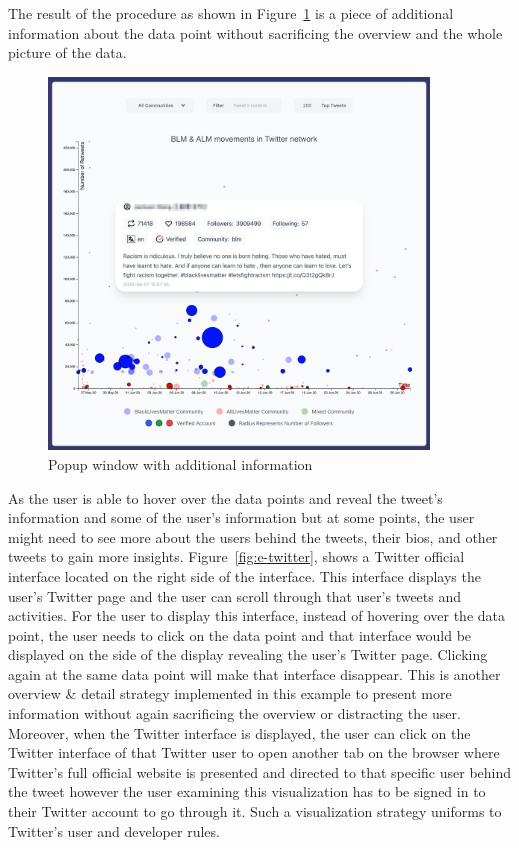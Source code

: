 \\\

The result of the procedure as shown in Figure~\ref{fig:e-popup} is a piece of additional information about the data point without sacrificing the overview and the whole picture of the data.


\begin{figure}[H]
\centering
\captionsetup{justification=centering}
\includegraphics[width=0.9\textwidth]{Report-latex/tex_files/pics/example/popup.png}
\caption{Popup window with additional information}
\label{fig:e-popup}
\end{figure}

As the user is able to hover over the data points and reveal the tweet's information and some of the user's information but at some points, the user might need to see more about the users behind the tweets, their bios, and other tweets to gain more insights. Figure~\ref{fig:e-twitter}, shows a Twitter official interface located on the right side of the interface. This interface displays the user's Twitter page and the user can scroll through that user's tweets and activities. For the user to display this interface, instead of hovering over the data point, the user needs to click on the data point and that interface would be displayed on the side of the display revealing the user's Twitter page. Clicking again at the same data point will make that interface disappear. This is another overview \& detail strategy implemented in this example to present more information without again sacrificing the overview or distracting the user. Moreover, when the Twitter interface is displayed, the user can click on the Twitter interface of that Twitter user to open another tab on the browser where Twitter's full official website is presented and directed to that specific user behind the tweet however the user examining this visualization has to be signed in to their Twitter account to go through it. Such a visualization strategy uniforms to Twitter's user and developer rules.


